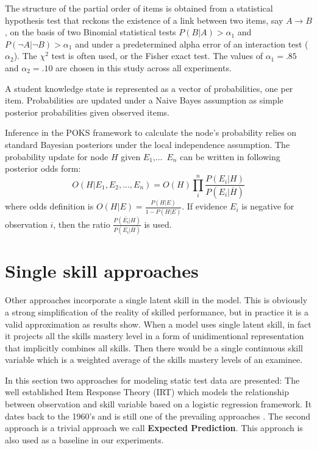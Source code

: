 The structure of the partial order of items is obtained from a statistical hypothesis test that reckons the existence of a link between two items, say $A \rightarrow B$, on the basis of two Binomial statistical tests $P(B|A) > \alpha_1$ and $P(\neg A|\neg B) > \alpha_1$ and under a predetermined alpha error of an interaction test ($\alpha_2$).  The $\chi^2$ test is often used, or the Fisher exact test.  The values of $\alpha_1 = .85$ and $\alpha_2 = .10$ are chosen in this study across all experiments.

A student knowledge state is represented as a vector of probabilities, one per item.  Probabilities are updated under a Naive Bayes assumption as simple posterior probabilities given observed items.

Inference in the POKS framework to calculate the node's probability relies on standard Bayesian posteriors under the local independence assumption. The probability update for node $H$ given $E_1$,...~$E_n$ can be written in following posterior odds form:
\begin{equation}
O(H|E_1,E_2, ... , E_n) = O(H) \prod_{i}^{n} \frac{P(E_i|H)}{P(E_i | \overline{H})}
\label{EQPOKSratio}
\end{equation}
where odds definition is $O(H|E) = \frac{P(H|E)}{1-P(H|E)}$. If evidence $E_i$ is negative for observation $i$, then the ratio $\frac{P(\overline{E_i}|H)}{P(\overline{E_i}|\overline{H})}$ is used.


\section{Single skill approaches}

Other approaches incorporate a single latent skill in the model. This is obviously a strong simplification of the reality of skilled performance, but in practice it is a valid approximation as results show. When a model uses single latent skill, in fact it projects all the skills mastery level in a form of unidimentional representation that implicitly combines all skills. Then there would be a single continuous skill variable which is a weighted average of the skills mastery levels of an examinee. 

In this section two approaches for modeling static test data are presented: The well established Item Response Theory (IRT) which models the relationship between observation and skill variable based on a logistic regression framework. It dates back to the 1960's and is still one of the prevailing approaches \citep{bakerKim2004}.  The second approach is a trivial approach we call \textbf{Expected Prediction}. This approach is also used as a baseline in our experiments.

